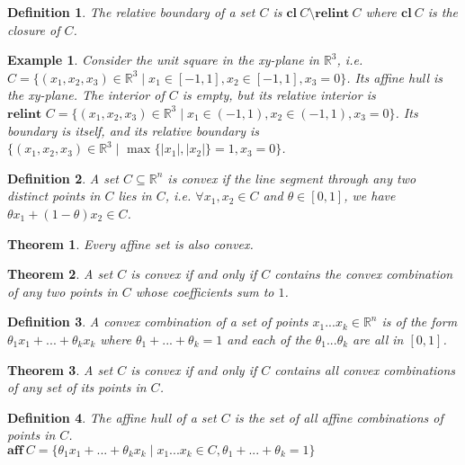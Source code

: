 \documentclass[a4paper]{article}
\newtheorem{mytheorem}{Theorem}
\newtheorem{example}{Example}
\newtheorem{mydef}{Definition}
\numberwithin{mytheorem}{section}
\numberwithin{mydef}{section}
\numberwithin{example}{section}
\begin{document}
\begin{mydef} The relative boundary of a set $C$ is $\textbf{cl} \ C \setminus \textbf{relint} \ C$ where $\textbf{cl} \ C $ is the closure of $C$.
\end{mydef}

\begin{example} Consider the unit square in the xy-plane in $\mathbb{R}^{3}$, i.e. $C = \{ (x_{1},x_{2},x_{3}) \in \mathbb{R}^{3} \mid x_{1} \in [-1,1],x_{2} \in [-1,1],x_{3} = 0 \}$. Its affine hull is the xy-plane. The interior of $C$ is empty, but its relative interior is $\textbf{relint } C = \{ (x_{1},x_{2},x_{3}) \in \mathbb{R}^{3} \mid x_{1} \in (-1,1),x_{2} \in (-1,1),x_{3} = 0 \}$. Its boundary is itself, and its relative boundary is $\{ (x_{1},x_{2},x_{3}) \in \mathbb{R}^{3} \mid \text{ max }\{|x_{1}|,|x_{2}| \} = 1, x_{3} = 0 \}$.
\end{example}

\begin{mydef} A set $C \subseteq \mathbb{R}^{n}$ is convex if the line segment through any two distinct points in $C$ lies in $C$, i.e. $\forall x_{1},x_{2} \in C$ and $\theta \in [0,1]$, we have $\theta x_{1} + (1-\theta)x_{2} \in C$.
\end{mydef}

\begin{mytheorem} Every affine set is also convex. \end{mytheorem}

\begin{mytheorem} A set $C$ is convex if and only if $C$ contains the convex combination of any two points in $C$ whose coefficients sum to $1$. \end{mytheorem}

\begin{mydef} A convex combination of a set of points $x_{1}...x_{k} \in \mathbb{R}^{n}$ is of the form $\theta_{1}x_{1} + ... + \theta_{k}x_{k}$ where $\theta_{1} + ... + \theta_{k} = 1$ and each of the $\theta_{1}...\theta_{k}$ are all in $[0,1]$.
\end{mydef}

\begin{mytheorem} A set $C$ is convex if and only if $C$ contains all convex combinations of any set of its points in $C$. \end{mytheorem}

\begin{mydef} The affine hull of a set $C$ is the set of all affine combinations of points in $C$. \\
$\textbf{aff} \ C = \{ \theta_{1}x_{1} + ... + \theta_{k}x_{k} \mid x_{1}...x_{k} \in C, \theta_{1} + ... + \theta_{k} = 1  \}$ \end{mydef}
\end{document}
